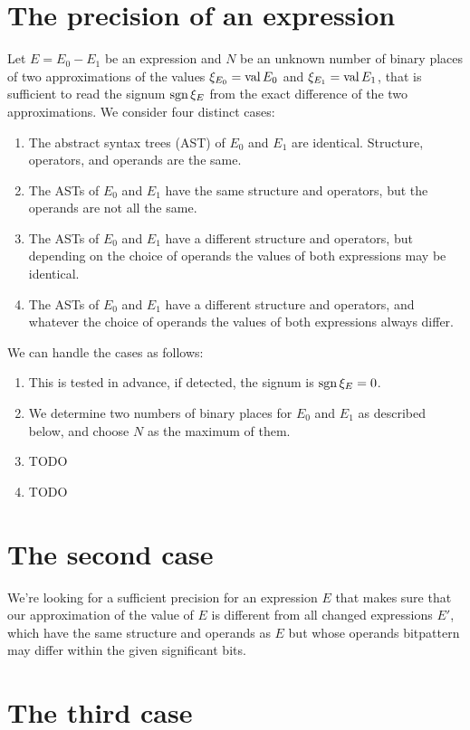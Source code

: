 %
%
\pagebreak
\section{The precision of an expression}

Let $E=E_0-E_1$ be an expression 
and $N$ be an unknown number of binary places of two approximations
of the values $\xi_{E_0}=\mathop{\rm val}\nolimits E_0$ and $\xi_{E_1}=\mathop{\rm val}\nolimits E_1$, 
that is sufficient to read the signum $\operatorname{sgn}\xi_E$
from the exact difference of the two approximations.
We consider four distinct cases:
\begin{enumerate}
\item The abstract syntax trees (AST) of $E_0$ and $E_1$ are identical. 
	  Structure, operators, and operands are the same.
\item The ASTs of $E_0$ and $E_1$ have the same
	  structure and operators, but the operands are not all the same.
\item The ASTs of $E_0$ and $E_1$ have a different
	  structure and operators, but depending on the choice of operands
	  the values of both expressions may be identical.
\item The ASTs of $E_0$ and $E_1$ have a different
	  structure and operators, and whatever the choice of operands
	  the values of both expressions always differ.
\end{enumerate}
We can handle the cases as follows:
\begin{enumerate}
\item This is tested in advance, if detected, the signum is $\operatorname{sgn}\xi_E=0$.
\item We determine two numbers of binary places for $E_0$ and $E_1$
      as described below, and choose $N$ as the maximum of them.
\item TODO
\item TODO
\end{enumerate}


\section{The second case}

We're looking for a sufficient precision for an expression $E$ 
that makes sure that our approximation of the value of $E$
is different from all changed expressions $E'$, which have
the same structure and operands as $E$ but whose operands
bitpattern may differ within the given significant bits.


\section{The third case}

